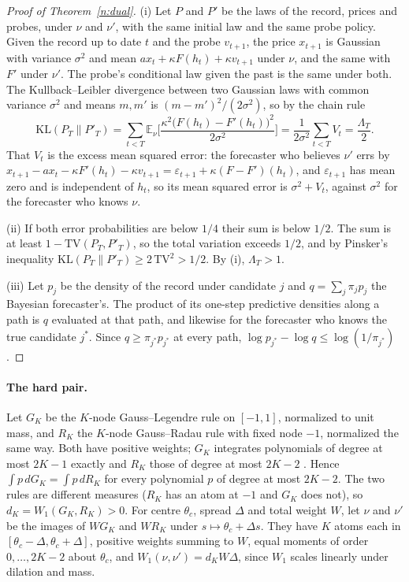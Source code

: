 \begin{proof}[Proof of Theorem~\ref{n:dual}]
(i) Let $P$ and $P'$ be the laws of the record, prices and probes, under $\nu$ and $\nu'$, with the same initial law and the same probe policy. Given the record up to date $t$ and the probe $v_{t+1}$, the price $x_{t+1}$ is Gaussian with variance $\sigma^2$ and mean $ax_t+\kappa F(h_t)+\kappa v_{t+1}$ under $\nu$, and the same with $F'$ under $\nu'$. The probe's conditional law given the past is the same under both. The Kullback--Leibler divergence between two Gaussian laws with common variance $\sigma^2$ and means $m,m'$ is $(m-m')^2/(2\sigma^2)$, so by the chain rule
\[
\mathrm{KL}(P_T\|P'_T)=\sum_{t<T}\mathbb E_\nu\Big[\frac{\kappa^2\big(F(h_t)-F'(h_t)\big)^2}{2\sigma^2}\Big]=\frac{1}{2\sigma^2}\sum_{t<T}V_t=\frac{\Lambda_T}{2}.
\]
That $V_t$ is the excess mean squared error: the forecaster who believes $\nu'$ errs by $x_{t+1}-ax_t-\kappa F'(h_t)-\kappa v_{t+1}=\varepsilon_{t+1}+\kappa(F-F')(h_t)$, and $\varepsilon_{t+1}$ has mean zero and is independent of $h_t$, so its mean squared error is $\sigma^2+V_t$, against $\sigma^2$ for the forecaster who knows $\nu$.

(ii) If both error probabilities are below $1/4$ their sum is below $1/2$. The sum is at least $1-\mathrm{TV}(P_T,P'_T)$, so the total variation exceeds $1/2$, and by Pinsker's inequality $\mathrm{KL}(P_T\|P'_T)\ge2\,\mathrm{TV}^2>1/2$. By (i), $\Lambda_T>1$.

(iii) Let $p_j$ be the density of the record under candidate $j$ and $q=\sum_j\pi_jp_j$ the Bayesian forecaster's. The product of its one-step predictive densities along a path is $q$ evaluated at that path, and likewise for the forecaster who knows the true candidate $j^*$. Since $q\ge\pi_{j^*}p_{j^*}$ at every path, $\log p_{j^*}-\log q\le\log(1/\pi_{j^*})$.
\end{proof}

\paragraph{The hard pair.} Let $G_K$ be the $K$-node Gauss--Legendre rule on $[-1,1]$, normalized to unit mass, and $R_K$ the $K$-node Gauss--Radau rule with fixed node $-1$, normalized the same way. Both have positive weights; $G_K$ integrates polynomials of degree at most $2K-1$ exactly and $R_K$ those of degree at most $2K-2$ \citep[Section~3.4]{szego1975}. Hence $\int p\,dG_K=\int p\,dR_K$ for every polynomial $p$ of degree at most $2K-2$. The two rules are different measures ($R_K$ has an atom at $-1$ and $G_K$ does not), so $d_K=W_1(G_K,R_K)>0$. For centre $\theta_c$, spread $\Delta$ and total weight $W$, let $\nu$ and $\nu'$ be the images of $WG_K$ and $WR_K$ under $s\mapsto\theta_c+\Delta s$. They have $K$ atoms each in $[\theta_c-\Delta,\theta_c+\Delta]$, positive weights summing to $W$, equal moments of order $0,\ldots,2K-2$ about $\theta_c$, and $W_1(\nu,\nu')=d_KW\Delta$, since $W_1$ scales linearly under dilation and mass.

